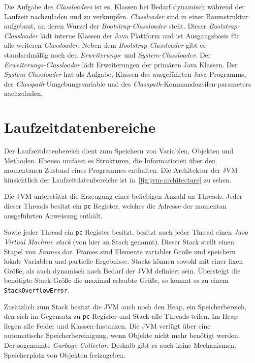 Die Aufgabe des \textit{Classloaders} ist es, Klassen bei Bedarf dynamisch während der Laufzeit nachzuladen und zu verknüpfen. \textit{Classloader} sind in einer Baumstruktur aufgebaut, an deren Wurzel der \textit{Bootstrap-Classloader} steht. Dieser \textit{Bootstrap-Classloader} lädt interne Klassen der Java Plattform und ist Ausgangsbasis für alle weiteren \textit{Classloader}. Neben dem \textit{Bootstrap-Classloader} gibt es standardmäßig noch den \textit{Erweiterungs}- und \textit{System-Classloader}. Der \textit{Erweiterungs-Classloader} lädt Erweiterungen der primären Java Klassen. Der \textit{System-Classloader} hat als Aufgabe, Klassen des ausgeführten Java-Programms, der \textit{Classpath}-Umgebungsvariable und des \textit{Classpath}-Kommandozeilen\break-parameters nachzuladen.

\section{Laufzeitdatenbereiche}

Der Laufzeitdatenbereich dient zum Speichern von Variablen, Objekten und Methoden. Ebenso umfasst es Strukturen, die Informationen über den momentanen Zustand eines Programmes enthalten. Die Architektur der JVM hinsichtlich der Laufzeitdatenbereiche ist in~\autoref{fig:jvm-architecture} zu sehen.

Die JVM unterstützt die Erzeugung einer beliebigen Anzahl an Threads. Jeder dieser Threads besitzt ein \texttt{pc} Register, welches die Adresse der momentan ausgeführten Anweisung enthält.

Sowie jeder Thread ein \texttt{pc} Register besitzt, besitzt auch jeder Thread einen \textit{Java Virtual Machine stack} (von hier an Stack genannt). Dieser Stack stellt einen Stapel von \textit{Frames} dar. Frames sind Elemente variabler Größe und speichern lokale Variablen und partielle Ergebnisse. Stacks können sowohl mit einer fixen Größe, als auch dynamisch nach Bedarf der JVM definiert sein. Übersteigt die benötigte Stack-Größe die maximal erlaubte Größe, so kommt es zu einem \texttt{StackOverflowError}.

Zusätzlich zum Stack besitzt die JVM auch noch den Heap, ein Speicherbereich, den sich im Gegensatz zu \texttt{pc} Register und Stack alle Threads teilen. Im Heap liegen alle Felder und Klassen-Instanzen. Die JVM verfügt über eine automatische Speicherbereinigung, wenn Objekte nicht mehr benötigt werden: Der sogenannte \textit{Garbage Collector}. Deshalb gibt es auch keine Mechanismen, Speicherplatz von Objekten freizugeben.

